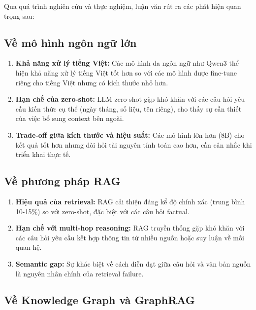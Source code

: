 Qua quá trình nghiên cứu và thực nghiệm, luận văn rút ra các phát hiện quan trọng sau:

\subsection{Về mô hình ngôn ngữ lớn}

\begin{enumerate}
    \item \textbf{Khả năng xử lý tiếng Việt:} Các mô hình đa ngôn ngữ như Qwen3 thể hiện khả năng xử lý tiếng Việt tốt hơn so với các mô hình được fine-tune riêng cho tiếng Việt nhưng có kích thước nhỏ hơn.
    
    \item \textbf{Hạn chế của zero-shot:} LLM zero-shot gặp khó khăn với các câu hỏi yêu cầu kiến thức cụ thể (ngày tháng, số liệu, tên riêng), cho thấy sự cần thiết của việc bổ sung context bên ngoài.
    
    \item \textbf{Trade-off giữa kích thước và hiệu suất:} Các mô hình lớn hơn (8B) cho kết quả tốt hơn nhưng đòi hỏi tài nguyên tính toán cao hơn, cần cân nhắc khi triển khai thực tế.
\end{enumerate}

\subsection{Về phương pháp RAG}

\begin{enumerate}
    \item \textbf{Hiệu quả của retrieval:} RAG cải thiện đáng kể độ chính xác (trung bình 10-15\%) so với zero-shot, đặc biệt với các câu hỏi factual.
    
    \item \textbf{Hạn chế với multi-hop reasoning:} RAG truyền thống gặp khó khăn với các câu hỏi yêu cầu kết hợp thông tin từ nhiều nguồn hoặc suy luận về mối quan hệ.
    
    \item \textbf{Semantic gap:} Sự khác biệt về cách diễn đạt giữa câu hỏi và văn bản nguồn là nguyên nhân chính của retrieval failure.
\end{enumerate}

\subsection{Về Knowledge Graph và GraphRAG}

